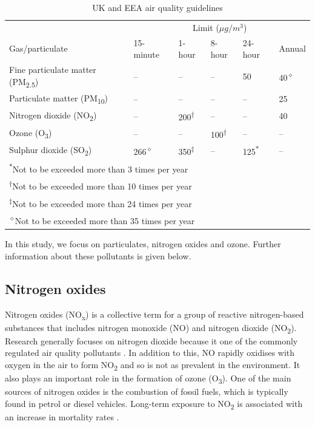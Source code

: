 \documentclass[11pt,twosided,a4paper]{report}
\begin{document}
\begin{table}[!tbp]
  \centering
  \small
  \caption{UK and EEA air quality guidelines}
  \label{airqualityguidelines}
  \begin{tabular}{ l l l l l l }
  \toprule
  & \multicolumn{5}{c}{Limit ($\mu g/m^3$)} 													\\ \cmidrule(l{0mm}r{0mm}){2-6}
  Gas/particulate  							& 15-minute 	& 1-hour 	& 8-hour 	& 24-hour 	& Annual 	\\ \midrule
  Fine particulate matter (PM\textsubscript{2.5}) 	& -- 			& -- 		& -- 		& 50 		& 40\textsuperscript{$\diamond$} 		\\
  Particulate matter (PM\textsubscript{10}) 		& -- 			& -- 		& -- 		& -- 		& 25 		\\
  Nitrogen dioxide (NO\textsubscript{2}) 			& -- 			& 200\textsuperscript{$\dagger$} 	& -- 		& -- 		& 40 		\\
  Ozone (O\textsubscript{3}) 					& -- 			& -- 		& 100\textsuperscript{$\dagger$}	& --		& -- 		\\
  Sulphur dioxide (SO\textsubscript{2})			& 266\textsuperscript{$\diamond$}		& 350\textsuperscript{$\ddagger$}	& --		& 125\textsuperscript{*}	& -- 		\\ \bottomrule
  \multicolumn{6}{l}{\textsuperscript{$\ast$}\footnotesize{Not to be exceeded more than 3 times per year}} \\
  \multicolumn{6}{l}{\textsuperscript{$\dagger$}\footnotesize{Not to be exceeded more than 10 times per year}} \\
  \multicolumn{6}{l}{\textsuperscript{$\ddagger$}\footnotesize{Not to be exceeded more than 24 times per year}} \\
  \multicolumn{6}{l}{\textsuperscript{$\diamond$}\footnotesize{Not to be exceeded more than 35 times per year}} \\
  \end{tabular}
\end{table}


In this study, we focus on particulates, nitrogen oxides and ozone. Further information about these pollutants is given below.

\subsection{Nitrogen oxides}

Nitrogen oxides (NO\textsubscript{x}) is a collective term for a group of reactive nitrogen-based substances that includes nitrogen monoxide (NO) and nitrogen dioxide (NO\textsubscript{2}). Research generally focuses on nitrogen dioxide because it one of the commonly regulated air quality pollutants \citep{Brook2004cardiostmnt}. In addition to this, NO rapidly oxidises with oxygen in the air to form NO\textsubscript{2} and so is not as prevalent in the environment. It also plays an important role in the formation of ozone (O\textsubscript{3}). One of the main sources of nitrogen oxides is the combustion of fossil fuels, which is typically found in petrol or diesel vehicles. Long-term exposure to NO\textsubscript{2} is associated with an increase in mortality rates \citep{Faustini2014nitrogenmortality}.
\end{document}
